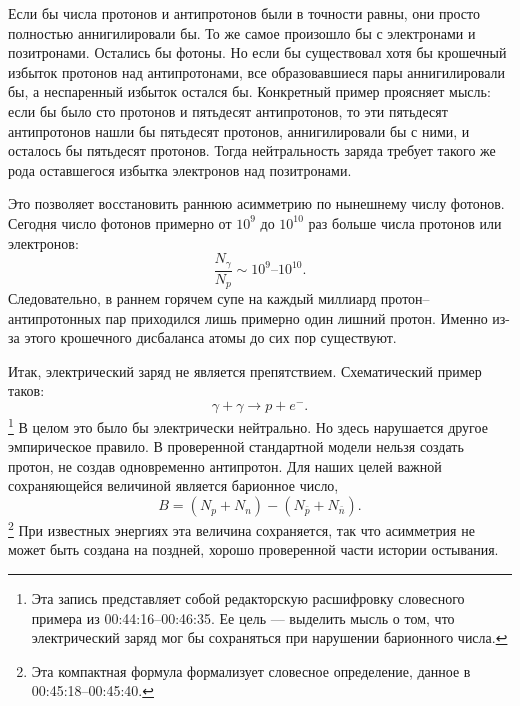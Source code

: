 Если бы числа протонов и антипротонов были в точности равны, они просто полностью аннигилировали бы. То же самое произошло бы с электронами и позитронами. Остались бы фотоны. Но если бы существовал хотя бы крошечный избыток протонов над антипротонами, все образовавшиеся пары аннигилировали бы, а неспаренный избыток остался бы. Конкретный пример проясняет мысль: если бы было сто протонов и пятьдесят антипротонов, то эти пятьдесят антипротонов нашли бы пятьдесят протонов, аннигилировали бы с ними, и осталось бы пятьдесят протонов. Тогда нейтральность заряда требует такого же рода оставшегося избытка электронов над позитронами.

Это позволяет восстановить раннюю асимметрию по нынешнему числу фотонов. Сегодня число фотонов примерно от \(10^9\) до \(10^{10}\) раз больше числа протонов или электронов:
\[
\frac{N_\gamma}{N_p} \sim 10^9\text{--}10^{10}.
\]
Следовательно, в раннем горячем супе на каждый миллиард протон--антипротонных пар приходился лишь примерно один лишний протон. Именно из-за этого крошечного дисбаланса атомы до сих пор существуют.

\begin{classroomqa}
\end{classroomqa}

Итак, электрический заряд не является препятствием. Схематический пример таков:
\[
\gamma + \gamma \to p + e^-.
\]\footnote{Эта запись представляет собой редакторскую расшифровку словесного примера из 00:44:16--00:46:35. Ее цель — выделить мысль о том, что электрический заряд мог бы сохраняться при нарушении барионного числа.}
В целом это было бы электрически нейтрально. Но здесь нарушается другое эмпирическое правило. В проверенной стандартной модели нельзя создать протон, не создав одновременно антипротон. Для наших целей важной сохраняющейся величиной является барионное число,
\[
B=(N_p+N_n)-(N_{\bar p}+N_{\bar n}).
\]\footnote{Эта компактная формула формализует словесное определение, данное в 00:45:18--00:45:40.}
При известных энергиях эта величина сохраняется, так что асимметрия не может быть создана на поздней, хорошо проверенной части истории остывания.

